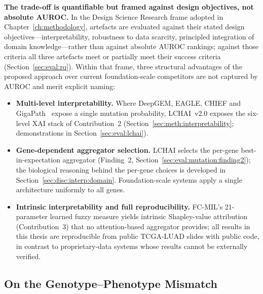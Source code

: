 \textbf{The trade-off is quantifiable but framed against design
objectives, not absolute AUROC.}
In the Design Science Research frame adopted in
Chapter~\ref{ch:methodology}, artefacts are evaluated against
their stated design objectives---interpretability, robustness to
data scarcity, principled integration of domain knowledge---rather
than against absolute AUROC rankings; against those criteria all
three artefacts meet or partially meet their success criteria
(Section~\ref{sec:eval:rq}).
Within that frame, three structural advantages of the proposed
approach over current foundation-scale competitors are not
captured by AUROC and merit explicit naming:
\begin{itemize}
  \item \textbf{Multi-level interpretability.} Where DeepGEM,
        EAGLE, CHIEF and GigaPath~\cite{zhao2025deepgem,%
        campanella2025eagle,wang2024chief,xu2024gigapath} expose
        a single mutation probability, LCHAI~v2.0 exposes the
        six-level XAI stack of Contribution~2
        (Section~\ref{sec:meth:interpretability};
        demonstrations in Section~\ref{sec:eval:lchai}).
  \item \textbf{Gene-dependent aggregator selection.} LCHAI
        selects the per-gene best-in-expectation aggregator
        (Finding~2, Section~\ref{sec:eval:mutation:finding2}); the
        biological reasoning behind the per-gene choices is
        developed in Section~\ref{sec:disc:interp:domain}.
        Foundation-scale systems apply a single architecture
        uniformly to all genes.
  \item \textbf{Intrinsic interpretability and full
        reproducibility.} FC-MIL's 21-parameter learned fuzzy
        measure yields intrinsic Shapley-value attribution
        (Contribution~3) that no attention-based aggregator
        provides; all results in this thesis are reproducible
        from public TCGA-LUAD slides with public code, in
        contrast to proprietary-data systems whose results
        cannot be externally verified.
\end{itemize}


\subsection{On the Genotype--Phenotype Mismatch}
\label{sec:disc:genotype_phenotype}

